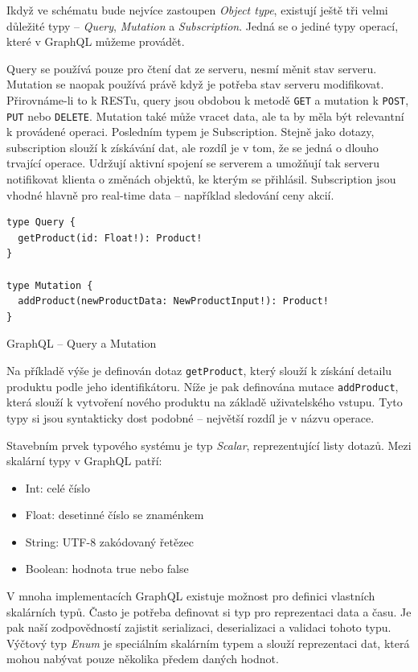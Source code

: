 \documentclass[thesis=M,czech]{FITthesis}[2019/12/23]
\begin{document}
Ikdyž ve schématu bude nejvíce zastoupen \textit{Object type}, existují ještě tři velmi důležité typy -- \textit{Query}, \textit{Mutation} a \textit{Subscription}. Jedná se o jediné typy operací, které v GraphQL můžeme provádět.

Query se používá pouze pro čtení dat ze serveru, nesmí měnit stav serveru. Mutation se naopak používá právě když je potřeba stav serveru modifikovat. Přirovnáme-li to k RESTu, query jsou obdobou k metodě \texttt{GET} a mutation k \texttt{POST}, \texttt{PUT} nebo \texttt{DELETE}. Mutation také může vracet data, ale ta by měla být relevantní k provádené operaci.
Posledním typem je Subscription. Stejně jako dotazy, subscription slouží k získávání dat, ale rozdíl je v tom, že se jedná o dlouho trvající operace. Udržují aktivní spojení se serverem a umožňují tak serveru notifikovat klienta o změnách objektů, ke kterým se přihlásil. Subscription jsou vhodné hlavně pro real-time data -- například sledování ceny akcií.

\begin{listing}[H]
\begin{verbatim}
type Query {    
  getProduct(id: Float!): Product!
}

type Mutation {
  addProduct(newProductData: NewProductInput!): Product!
}
\end{verbatim}
\caption{GraphQL -- Query a Mutation}
\label{lst:graphql_query_mutation}
\end{listing}

Na příkladě výše je definován dotaz \texttt{getProduct}, který slouží k získání detailu produktu podle jeho identifikátoru. Níže je pak definována mutace \texttt{addProduct}, která slouží k vytvoření nového produktu na základě uživatelského vstupu. Tyto typy si jsou syntakticky dost podobné -- největší rozdíl je v názvu operace.

Stavebním prvek typového systému je typ \textit{Scalar}, reprezentující listy dotazů. Mezi skalární typy v GraphQL patří:
\begin{itemize}
    \item Int: celé číslo
    \item Float: desetinné číslo se znaménkem
    \item String: UTF-8 zakódovaný řetězec
    \item Boolean: hodnota true nebo false
\end{itemize}
V mnoha implementacích GraphQL existuje možnost pro definici vlastních skalárních typů. Často je potřeba definovat si typ pro reprezentaci data a času. Je pak naší zodpovědností zajistit serializaci, deserializaci a validaci tohoto typu. Výčtový typ \textit{Enum} je speciálním skalárním typem a slouží reprezentaci dat, která mohou nabývat pouze několika předem daných hodnot. 
\end{document}
